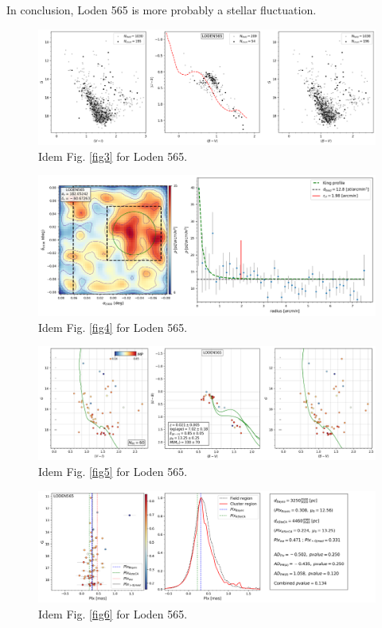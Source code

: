 \documentclass[draft]{aa}
\begin{document}
In conclusion, Loden 565 is more probably a stellar fluctuation.

\begin{figure}[ht]
    \centering
    \includegraphics[width=\hsize]{../figs/obs_LODEN565.png}
    \caption{Idem Fig. \ref{fig3} for Loden 565.}
    \label{fig55}
\end{figure}
\begin{figure}[ht]
    \centering
    \includegraphics[width=\hsize]{../figs/dmap_loden565.png}
    \caption{Idem Fig. \ref{fig4} for Loden 565.}
    \label{fig56}
\end{figure}
\begin{figure}[ht]
    \centering
    \includegraphics[width=\hsize]{../figs/cmds_loden565.png}
    \caption{Idem Fig. \ref{fig5} for Loden 565.}
    \label{fig57}
\end{figure}
\begin{figure}[ht]
    \centering
    \includegraphics[width=\hsize]{../figs/plx_LODEN565.png}
    \caption{Idem Fig. \ref{fig6} for Loden 565.}
    \label{fig58}
\end{figure}
\end{document}
